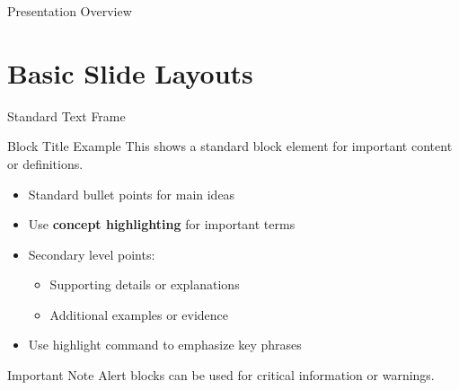 \documentclass[aspectratio=169]{beamer}
\newcommand{\hilight}[1]{\colorbox{myorange!30}{#1}}
\newcommand{\concept}[1]{\textcolor{myblue}{\textbf{#1}}}
\begin{document}
\begin{frame}[fragile]
  \titlepage
\end{frame}

\begin{frame}[fragile]{Presentation Overview}
  \tableofcontents[hideallsubsections]
\end{frame}

\section{Basic Slide Layouts}

\begin{frame}[fragile]{Standard Text Frame}
  \begin{block}{Block Title Example}
    This shows a standard block element for important content or definitions.
  \end{block}
  
  \begin{itemize}
    \item Standard bullet points for main ideas
    \item Use \concept{concept highlighting} for important terms
    \item Secondary level points:
    \begin{itemize}
      \item Supporting details or explanations
      \item Additional examples or evidence
    \end{itemize}
    \item Use \hilight{highlight command} to emphasize key phrases
  \end{itemize}
  
  \begin{alertblock}{Important Note}
    Alert blocks can be used for critical information or warnings.
  \end{alertblock}
\end{frame}
\end{document}
